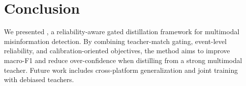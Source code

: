 \section{Conclusion}
We presented \modelname{}, a reliability-aware gated distillation framework for multimodal misinformation detection. By combining teacher-match gating, event-level reliability, and calibration-oriented objectives, the method aims to improve macro-F1 and reduce over-confidence when distilling from a strong multimodal teacher. Future work includes cross-platform generalization and joint training with debiased teachers.
